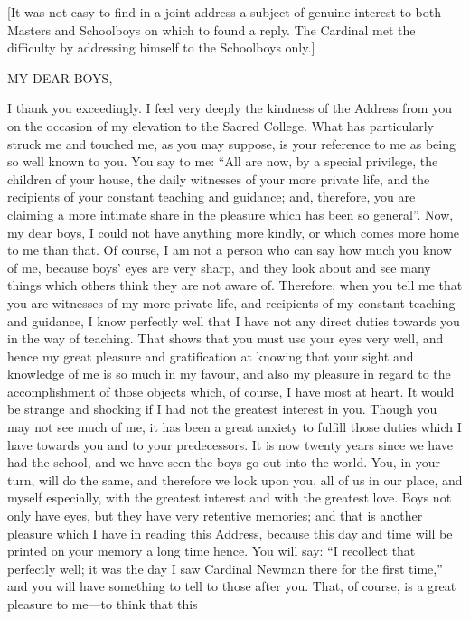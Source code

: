 [It was not easy to find in a joint address a subject of genuine
interest to both Masters and Schoolboys on which to found a reply. The
Cardinal met the difficulty by addressing himself to the Schoolboys
only.]


MY DEAR BOYS,

I thank you exceedingly. I feel very deeply the kindness of the
Address from you on the occasion of my elevation to the Sacred
College. What has particularly struck me and touched me, as you may
suppose, is your reference to me as being so well known to you. You
say to me: ``All are now, by a special privilege, the children of
your house, the daily witnesses of your more private life, and the
recipients of your constant teaching and guidance; and, therefore, you
are claiming a more intimate share in the pleasure which has been so
general''. Now, my dear boys, I could not have anything more
kindly, or which comes more home to me than that. Of course, I
am not a person who can say how much you know of me, because boys'
eyes are very sharp, and they look about and see many things which
others think they are not aware of. Therefore, when you tell me that
you are witnesses of my more private life, and recipients of my
constant teaching and guidance, I know perfectly well that I have not
any direct duties towards you in the way of teaching. That shows that
you must use your eyes very well, and hence my great pleasure and
gratification at knowing that your sight and knowledge of me is so
much in my favour, and also my pleasure in regard to the
accomplishment of those objects which, of course, I have most at
heart. It would be strange and shocking if I had not the greatest
interest in you. Though you may not see much of me, it has been a
great anxiety to fulfill those duties which I have towards you and to
your predecessors. It is now twenty years since we have had the
school, and we have seen the boys go out into the world. You, in your
turn, will do the same, and therefore we look upon you, all of us in
our place, and myself especially, with the greatest interest and with
the greatest love. Boys not only have eyes, but they have very
retentive memories; and that is another pleasure which I have in
reading this Address, because this day and time will be printed on
your memory a long time hence. You will say: ``I recollect that
perfectly well; it was the day I saw Cardinal Newman there for the
first time,'' and you will have something to tell to those after
you. That, of course, is a great pleasure to me—to think that this
